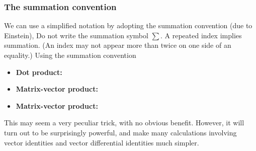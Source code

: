 \documentclass[notes]{beamer}
\begin{document}
\begin{frame}
\frametitle{The summation convention}
We can use a simplified notation by adopting the summation convention (due to Einstein),
Do not write the summation symbol $\sum$. A repeated index implies summation. (An index may not appear more than twice on one side of an
equality.) Using the summation convention
\begin{itemize}
	\item \textbf{Dot product: }
	\mode<handout>{
		\vspace{1cm}
	} 
	\item \textbf{Matrix-vector product:} 
	\mode<handout>{
		\vspace{1cm}
	}
	\item \textbf{Matrix-vector product:} 	
	\mode<handout>{
		\vspace{1cm}
	} 
\end{itemize}
This may seem a very peculiar trick, with no obvious benefit. However, it will turn out
to be surprisingly powerful, and make many calculations involving vector identities and
vector differential identities much simpler.
\end{frame}
\end{document}
